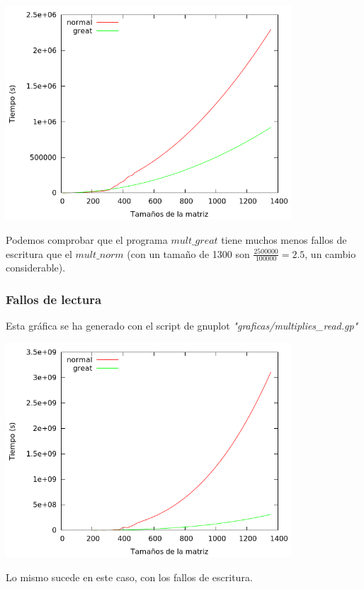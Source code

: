 \documentclass[nochap]{apuntes}
\begin{document}
\begin{center}
\includegraphics[width=0.8\textwidth]{graficas/fotos/multiplies_write.png}
\end{center}

Podemos comprobar que el programa $mult\_great$ tiene muchos menos fallos de escritura que el $mult\_norm$ (con un tamaño de 1300 son $\displaystyle \frac{2500000}{100000} = 2.5$, un cambio considerable).

\subsubsection{Fallos de lectura}

Esta gráfica se ha generado con el script de gnuplot \emph{"graficas/multiplies\_read.gp"}

\begin{center}
\includegraphics[width=0.8\textwidth]{graficas/fotos/multiplies_read.png}
\end{center}

Lo mismo sucede en este caso, con los fallos de escritura.
\end{document}
